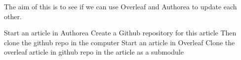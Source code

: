 The aim of this is to see if we can use Overleaf and Authorea to update each other. 

Start an article in Authorea
Create a Github repository for this article
Then clone the github repo in the computer
Start an article in Overleaf
Clone the overleaf article in github repo in the article as a submodule

